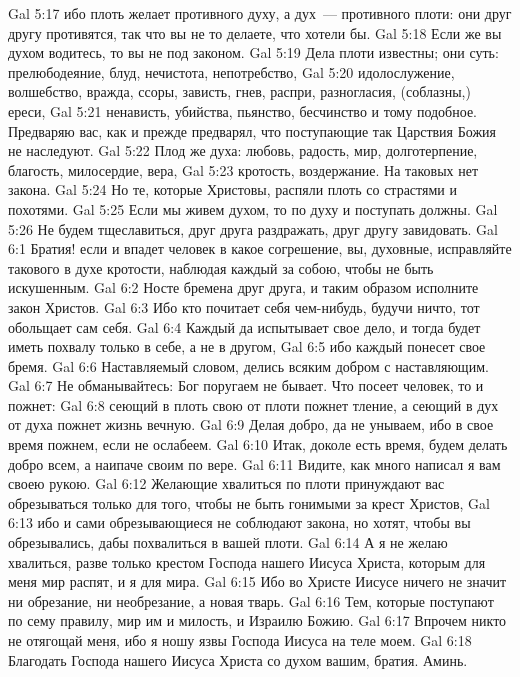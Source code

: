 \vs Gal 5:17 ибо плоть желает противного духу, а дух~--- противного плоти: они друг другу противятся, так что вы не то делаете, что хотели бы.
\vs Gal 5:18 Если же вы духом водитесь, то вы не под законом.
\vs Gal 5:19 Дела плоти известны; они суть: прелюбодеяние, блуд, нечистота, непотребство,
\vs Gal 5:20 идолослужение, волшебство, вражда, ссоры, зависть, гнев, распри, разногласия, (соблазны,) ереси,
\vs Gal 5:21 ненависть, убийства, пьянство, бесчинство и тому подобное. Предваряю вас, как и прежде предварял, что поступающие так Царствия Божия не наследуют.
\vs Gal 5:22 Плод же духа: любовь, радость, мир, долготерпение, благость, милосердие, вера,
\vs Gal 5:23 кротость, воздержание. На таковых нет закона.
\vs Gal 5:24 Но те, которые Христовы, распяли плоть со страстями и похотями.
\vs Gal 5:25 Если мы живем духом, то по духу и поступать должны.
\vs Gal 5:26 Не будем тщеславиться, друг друга раздражать, друг другу завидовать.
\vs Gal 6:1 Братия! если и впадет человек в какое согрешение, вы, духовные, исправляйте такового в духе кротости, наблюдая каждый за собою, чтобы не быть искушенным.
\vs Gal 6:2 Носте бремена друг друга, и таким образом исполните закон Христов.
\vs Gal 6:3 Ибо кто почитает себя чем-нибудь, будучи ничто, тот обольщает сам себя.
\vs Gal 6:4 Каждый да испытывает свое дело, и тогда будет иметь похвалу только в себе, а не в другом,
\vs Gal 6:5 ибо каждый понесет свое бремя.
\rsbpar\vs Gal 6:6 Наставляемый словом, делись всяким добром с наставляющим.
\vs Gal 6:7 Не обманывайтесь: Бог поругаем не бывает. Что посеет человек, то и пожнет:
\vs Gal 6:8 сеющий в плоть свою от плоти пожнет тление, а сеющий в дух от духа пожнет жизнь вечную.
\vs Gal 6:9 Делая добро, да не унываем, ибо в свое время пожнем, если не ослабеем.
\vs Gal 6:10 Итак, доколе есть время, будем делать добро всем, а наипаче своим по вере.
\rsbpar\vs Gal 6:11 Видите, как много написал я вам своею рукою.
\vs Gal 6:12 Желающие хвалиться по плоти принуждают вас обрезываться только для того, чтобы не быть гонимыми за крест Христов,
\vs Gal 6:13 ибо и сами обрезывающиеся не соблюдают закона, но хотят, чтобы вы обрезывались, дабы похвалиться в вашей плоти.
\vs Gal 6:14 А я не желаю хвалиться, разве только крестом Господа нашего Иисуса Христа, которым для меня мир распят, и я для мира.
\vs Gal 6:15 Ибо во Христе Иисусе ничего не значит ни обрезание, ни необрезание, а новая тварь.
\vs Gal 6:16 Тем, которые поступают по сему правилу, мир им и милость, и Израилю Божию.
\vs Gal 6:17 Впрочем никто не отягощай меня, ибо я ношу язвы Господа Иисуса на теле моем.
\rsbpar\vs Gal 6:18 Благодать Господа нашего Иисуса Христа со духом вашим, братия. Аминь.

